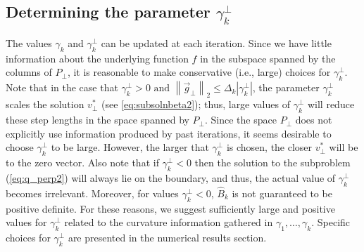 \subsection{Determining the parameter $\gamma^\perp_k$}\label{subsec:gammaperp}
The values $\gamma_k$ and $\gamma^\perp_k$ can be updated at each iteration.
Since we have little information about the underlying function $f$ in the
subspace spanned by the columns of $P_\perp$, it is reasonable to make
conservative (i.e., large) choices  for $\gamma^\perp_k$.  Note that in the case that
$\gamma^\perp_k > 0 \text{ and } \left \| \vec{g}_{\perp} \right \|_2 \le
\Delta_k |\gamma^\perp_k|$, the parameter $\gamma^\perp_k$ scales the
solution $v_\perp^*$ (see \ref{eq:subsolnbeta2}); thus, large values of
$\gamma^\perp_k$ will reduce these step lengths in the space spanned by
$P_\perp$.  Since the space $P_\perp$ does not explicitly use information
produced by past iterations, it seems desirable to choose $\gamma^\perp_k$
to be large.  However, the larger that $\gamma^\perp_k$ is chosen, 
the closer $v^*_\perp$ will be to the zero vector.
Also note that if
$\gamma^\perp_k<0$ then the solution to the subproblem (\ref{eq:q_perp2})
will always lie on the boundary, and thus, the actual value of
$\gamma^\perp_k$ becomes irrelevant.  Moreover,
for values $\gamma^\perp_k<0$, $\widehat{B}_k$ is not guaranteed to 
be positive definite. 
For these reasons, we suggest
sufficiently large and positive values for $\gamma^\perp_k$
related to the 
curvature information gathered in $\gamma_1, \ldots, \gamma_k$.
  Specific
choices for $\gamma^\perp_k$ are presented in the numerical results
section.

